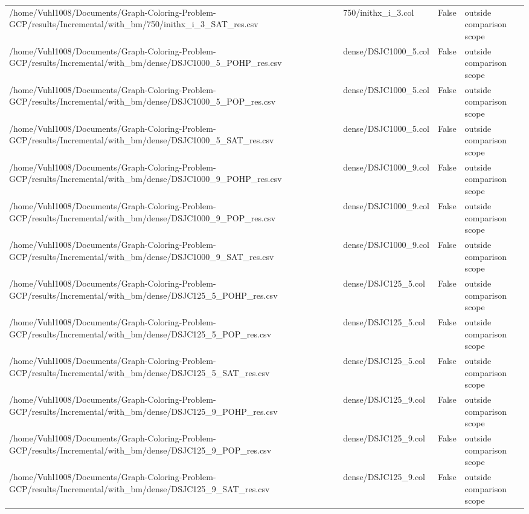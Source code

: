 \begin{table}[htbp]
\begin{tabular}{llll}
/home/Vuhl1008/Documents/Graph-Coloring-Problem-GCP/results/Incremental/with\_bm/750/inithx\_i\_3\_SAT\_res.csv & 750/inithx\_i\_3.col & False & outside comparison scope \\
/home/Vuhl1008/Documents/Graph-Coloring-Problem-GCP/results/Incremental/with\_bm/dense/DSJC1000\_5\_POHP\_res.csv & dense/DSJC1000\_5.col & False & outside comparison scope \\
/home/Vuhl1008/Documents/Graph-Coloring-Problem-GCP/results/Incremental/with\_bm/dense/DSJC1000\_5\_POP\_res.csv & dense/DSJC1000\_5.col & False & outside comparison scope \\
/home/Vuhl1008/Documents/Graph-Coloring-Problem-GCP/results/Incremental/with\_bm/dense/DSJC1000\_5\_SAT\_res.csv & dense/DSJC1000\_5.col & False & outside comparison scope \\
/home/Vuhl1008/Documents/Graph-Coloring-Problem-GCP/results/Incremental/with\_bm/dense/DSJC1000\_9\_POHP\_res.csv & dense/DSJC1000\_9.col & False & outside comparison scope \\
/home/Vuhl1008/Documents/Graph-Coloring-Problem-GCP/results/Incremental/with\_bm/dense/DSJC1000\_9\_POP\_res.csv & dense/DSJC1000\_9.col & False & outside comparison scope \\
/home/Vuhl1008/Documents/Graph-Coloring-Problem-GCP/results/Incremental/with\_bm/dense/DSJC1000\_9\_SAT\_res.csv & dense/DSJC1000\_9.col & False & outside comparison scope \\
/home/Vuhl1008/Documents/Graph-Coloring-Problem-GCP/results/Incremental/with\_bm/dense/DSJC125\_5\_POHP\_res.csv & dense/DSJC125\_5.col & False & outside comparison scope \\
/home/Vuhl1008/Documents/Graph-Coloring-Problem-GCP/results/Incremental/with\_bm/dense/DSJC125\_5\_POP\_res.csv & dense/DSJC125\_5.col & False & outside comparison scope \\
/home/Vuhl1008/Documents/Graph-Coloring-Problem-GCP/results/Incremental/with\_bm/dense/DSJC125\_5\_SAT\_res.csv & dense/DSJC125\_5.col & False & outside comparison scope \\
/home/Vuhl1008/Documents/Graph-Coloring-Problem-GCP/results/Incremental/with\_bm/dense/DSJC125\_9\_POHP\_res.csv & dense/DSJC125\_9.col & False & outside comparison scope \\
/home/Vuhl1008/Documents/Graph-Coloring-Problem-GCP/results/Incremental/with\_bm/dense/DSJC125\_9\_POP\_res.csv & dense/DSJC125\_9.col & False & outside comparison scope \\
/home/Vuhl1008/Documents/Graph-Coloring-Problem-GCP/results/Incremental/with\_bm/dense/DSJC125\_9\_SAT\_res.csv & dense/DSJC125\_9.col & False & outside comparison scope \\

\end{tabular}
\end{table}
